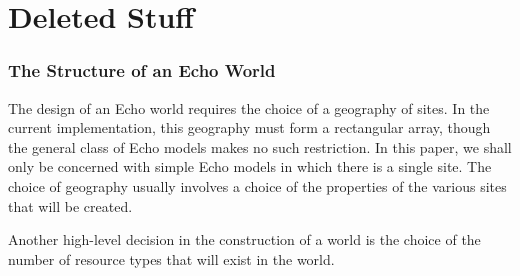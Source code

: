 



\section{Deleted Stuff}

\subsubsection{The Structure of an Echo World}





The design of an Echo world requires the choice of a geography of
sites. In the current implementation, this geography must form a
rectangular array, though the general class of Echo models makes no
such restriction. In this paper, we shall only be concerned with
simple Echo models in which there is a single site. The choice of
geography usually involves a choice of the properties of the various
sites that will be created.

Another high-level decision in the construction of a world is the
choice of the number of resource types that will exist in the world.

